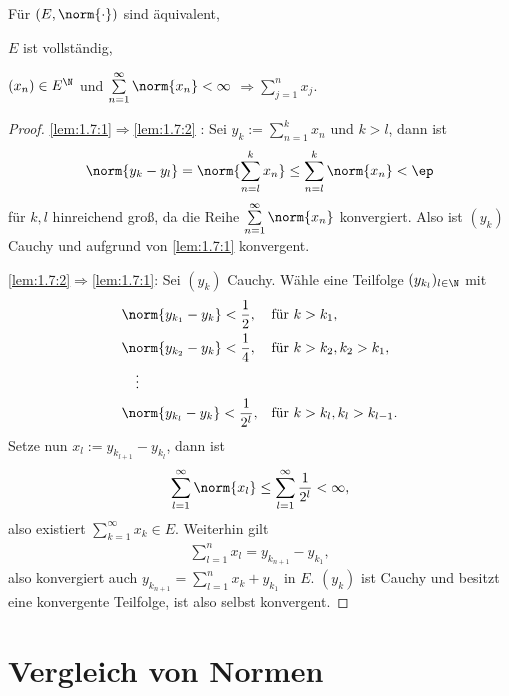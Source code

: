 \begin{lem}
\label{lem:1.7}
Für $(E,\norm{\cdot})$ sind äquivalent,
\begin{equivenum}
  \item\label{lem:1.7:1} $E$ ist vollständig,
  \item\label{lem:1.7:2} $(x_n)\in E^\N$ und $\sum\limits_{n=1}^\infty
  \norm{x_n} < \infty$
$\Rightarrow \sum\limits_{j=1}^n x_j$.\fishhere
\end{equivenum}
\end{lem}
\begin{proof}
\ref{lem:1.7:1}$\Rightarrow$\ref{lem:1.7:2} : Sei $y_k :=
\sum\limits_{n=1}^k x_n$ und $k>l$, dann ist
\begin{align*}
\norm{y_k-y_l} = \norm{\sum\limits_{n=l}^k x_n} \le \sum\limits_{n=l}^k
\norm{x_n} < \ep
\end{align*}
für $k,l$ hinreichend groß, da die Reihe $\sum\limits_{n=1}^\infty \norm{x_n}$
konvergiert. Also ist $(y_k)$ Cauchy und aufgrund von \ref{lem:1.7:1}
konvergent.

\ref{lem:1.7:2}$\Rightarrow$\ref{lem:1.7:1}: Sei $(y_k)$ Cauchy. Wähle eine
Teilfolge $(y_{k_l})_{l\in\N}$ mit
\begin{align*}
&\norm{y_{k_1}-y_k} < \frac{1}{2}, && \text{für }k>k_1,\\
&\norm{y_{k_2}-y_k} < \frac{1}{4}, && \text{für }k>k_2, k_2 >k_1,\\
&\quad\vdots\\
&\norm{y_{k_l}-y_{k}} < \frac{1}{2^l} , && \text{für }k>k_l, k_l >k_{l-1}.
\end{align*}
Setze nun $x_l := y_{k_{l+1}} - y_{k_l}$, dann ist
\begin{align*}
\sum\limits_{l=1}^\infty \norm{x_l} \le \sum\limits_{l=1}^\infty \frac{1}{2^l}
< \infty,
\end{align*}
also existiert $\sum\limits_{k=1}^\infty x_k\in E$.
Weiterhin gilt
\begin{align*}
\sum\limits_{l=1}^n x_l = y_{k_{n+1}} - y_{k_1},
\end{align*}
also konvergiert auch $y_{k_{n+1}} = \sum\limits_{l=1}^n x_k + y_{k_1}$ in $E$.
$(y_k)$ ist Cauchy und besitzt eine konvergente Teilfolge, ist also selbst
konvergent.\qedhere
\end{proof}

\section{Vergleich von Normen}

